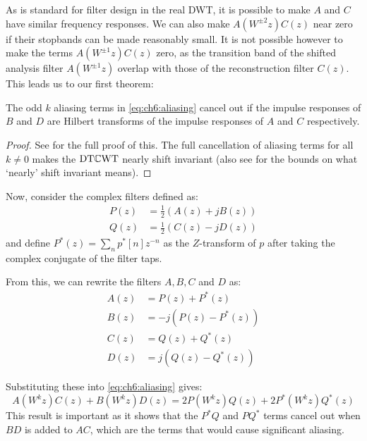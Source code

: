 As is standard for filter design in the real DWT, it is possible to make $A$ and $C$ have
similar frequency responses. We can also make $A(W^{\pm 2}z) C(z)$ near zero if
their stopbands can be made reasonably small. It is not possible however to make
the terms $A(W^{\pm 1}z)C(z)$ zero, as the transition band of the shifted
analysis filter $A(W^{\pm 1}z)$ overlap with those of the reconstruction filter
$C(z)$. This leads us to our first theorem:

\begin{theorem} \label{thm:ch6:shiftinv}
  The odd $k$ aliasing terms in \eqref{eq:ch6:aliasing} cancel out if the impulse
  responses of $B$ and $D$ are Hilbert transforms of the impulse responses of
  $A$ and $C$ respectively.
\end{theorem}

\begin{proof}
  See \cite[section 4]{kingsbury_complex_2001} for the full proof of
  this. The full cancellation of aliasing terms for all $k \neq 0$ makes the $\mathrm{DT}\mathbb{C}\mathrm{WT}$ 
  nearly shift invariant (also see \cite[section 7]{kingsbury_complex_2001} for the
  bounds on what `nearly' shift invariant means).  
\end{proof}

Now, consider the complex filters defined as:
\begin{align}
  P(z) &= \frac{1}{2}\left(A(z) + jB(z)\right) \label{eq:appD:p_eq}\\
  Q(z) &= \frac{1}{2}\left(C(z) - jD(z)\right) \label{eq:appD:q_eq}
\end{align}
and define $P^*(z) = \sum_{n} p^{*}[n] z^{-n}$ as the $Z$-transform of $p$
after taking the complex conjugate of the filter taps. 

From this, we can rewrite the filters $A, B, C$ and $D$ as:
\begin{align}
  A(z) &= P(z) + P^*(z) \\
  B(z) &= -j(P(z) - P^*(z)) \\
  C(z) &= Q(z) + Q^*(z) \\
  D(z) &= j(Q(z) - Q^*(z))
\end{align}

Substituting these into \eqref{eq:ch6:aliasing} gives:
\begin{equation}
  A(W^k z)C(z) + B(W^k z)D(z) = 2P(W^kz)Q(z) + 2P^*(W^kz)Q^*(z) \label{eq:ch6:complex_filts}
\end{equation}
This result is important as it shows that the $P^*Q$ and
$PQ^*$ terms cancel out when $BD$ is added to $AC$, which are the terms that
would cause significant aliasing.

